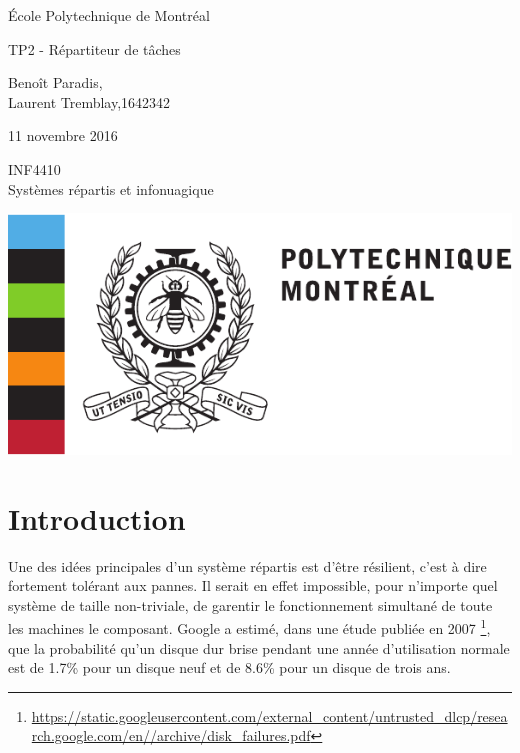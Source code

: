 \thispagestyle{empty}
\begin{center}

{\Large École Polytechnique de Montréal}


\vfill

{\Huge TP2 - Répartiteur de tâches\\}

\vfill

Benoît Paradis,  \\
Laurent Tremblay,1642342 \\ 


\vfill

11 novembre 2016

\vfill

INF4410 \\ 
Systèmes répartis et infonuagique

\vfill

\includegraphics[scale=0.7]{Poly_Logo-eps-converted-to.pdf}

\end{center}
\newpage


\tableofcontents
\newpage


% 

\section{Introduction}

Une des idées principales d'un système répartis est d'être résilient, c'est à dire fortement tolérant aux pannes.
Il serait en effet impossible, pour n'importe quel système de taille non-triviale, de garentir le fonctionnement 
simultané de toute les machines le composant. Google a estimé, dans une étude publiée en 2007 \footnote{\url{https://static.googleusercontent.com/external_content/untrusted_dlcp/research.google.com/en//archive/disk_failures.pdf}}, que la probabilité qu'un disque dur 
brise pendant une année d'utilisation normale est de 1.7\% pour un disque neuf et de 8.6\% pour un disque de trois ans. 


